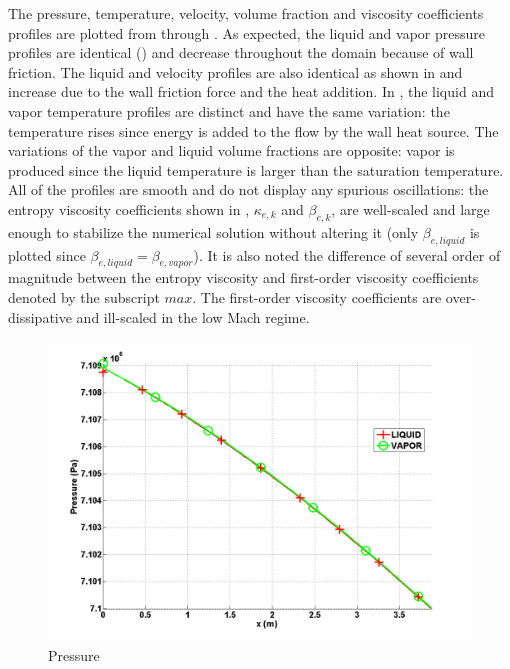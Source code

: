 The pressure, temperature, velocity, volume fraction and viscosity coefficients profiles are plotted from  through . As expected, the liquid and vapor pressure profiles are identical () and decrease throughout the domain because of wall friction. The liquid and velocity profiles are also identical as shown in  and increase due to the wall friction force and the heat addition. In , the liquid and vapor temperature profiles are distinct and have the same variation: the temperature rises since energy is added to the flow by the wall heat source. The variations of the vapor and liquid volume fractions are opposite: vapor is produced since the liquid temperature is larger than the saturation temperature. All of the profiles are smooth and do not display any spurious oscillations: the entropy viscosity coefficients shown in , $\kappa_{e,k}$ and $\beta_{e,k}$, are well-scaled and large enough to stabilize the numerical solution without altering it (only $\beta_{e,liquid}$ is plotted since $\beta_{e,liquid}=\beta_{e,vapor}$). It is also noted the difference of several order of magnitude between the entropy viscosity and first-order viscosity coefficients denoted by the subscript $max$. The first-order viscosity coefficients are over-dissipative and ill-scaled in the low Mach regime.
%
        \begin{figure}[H]
                \centering
                \includegraphics[width=\textwidth]{figures/SEM/ANS_WINTER_2014_7Eqn_pressure.png}
                \caption{Pressure}
                \label{fig:pressure}
        \end{figure}%

